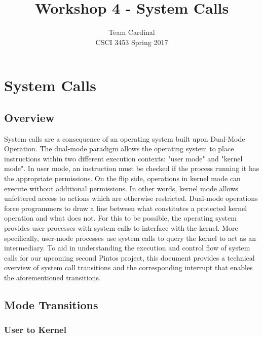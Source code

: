 \documentclass[11pt, letterpaper]{article}
\begin{document}

\title{Workshop 4 - System Calls}
\author{Team Cardinal\\CSCI 3453 Spring 2017}
\maketitle




\section{System Calls}

\subsection{Overview}
System calls are a consequence of an operating system built upon Dual-Mode Operation. The dual-mode paradigm allows the operating system to place instructions within two different execution contexts: "user mode" and "kernel mode". In user mode, an instruction must be checked if the process running it has the appropriate permissions. On the flip side, operations in kernel mode can execute without additional permissions. In other words, kernel mode allows unfettered access to actions which are otherwise restricted. Dual-mode operations force programmers to draw a line between what constitutes a protected kernel operation and what does not. For this to be possible, the operating system provides user processes with system calls to interface with the kernel. More specifically, user-mode processes use system calls to query the kernel to act as an intermediary. To aid in understanding the execution and control flow of system calls for our upcoming second Pintos project, this document provides a technical overview of system call transitions and the corresponding interrupt that enables the aforementioned transitions.

\subsection{Mode Transitions}

\subsubsection{User to Kernel}
\end{document}

